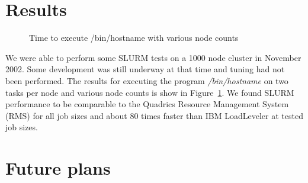 \documentclass[10pt,onecolumn,times]{../common/llncs}
\begin{document}
{%
%
%
%
%
%

\section{Results}

\begin{figure}[htb]
\centerline{}
\caption{Time to execute /bin/hostname with various node counts}
\label{timing}
\end{figure}

We were able to perform some SLURM tests on a 1000 node cluster in
November 2002. Some development was still underway at that time and
tuning had not been performed. The results for executing the program 
{\em /bin/hostname} on two tasks per node and various node counts is show in
Figure~\ref{timing}. We found SLURM performance to be comparable to the
Quadrics Resource Management System (RMS)\cite{Quadrics2002} for all
job sizes and about 80 times faster than IBM LoadLeveler\cite{LL2002}
at tested job sizes.

\section{Future plans}

}
\end{document}
